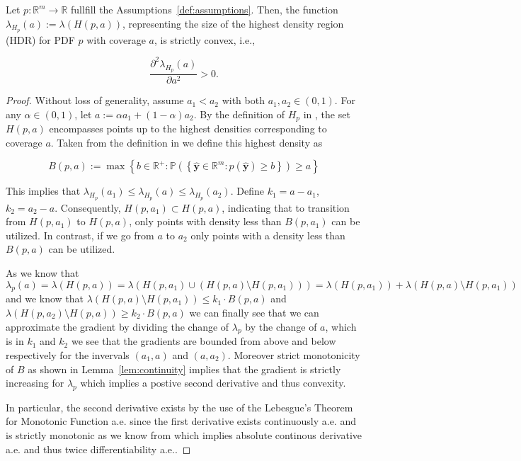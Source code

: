 \begin{lemma}
    Let \(p: \mathbb{R}^m \to \mathbb{R}\) fullfill the Assumptions~\ref{def:assumptions}. Then, the function \(\lambda_{H_p}(a) := \lambda(H(p, a))\), representing the size of the highest density region (HDR) for PDF \(p\) with coverage \(a\), is strictly convex, i.e.,

    \begin{equation}
        \frac{\partial^2 \lambda_{H_p}(a)}{\partial a^2} > 0. 
    \end{equation}

\end{lemma}
\begin{proof}
    Without loss of generality, assume \(a_1 < a_2\) with both \(a_1, a_2 \in (0,1)\). For any \(\alpha \in (0, 1)\), let \(a := \alpha a_1 + (1-\alpha) a_2\). By the definition of \(H_p\) in , the set \(H(p, a)\) encompasses points up to the highest densities corresponding to coverage \(a\). Taken from the definition in  we define this highest density as

    \begin{equation}
        B(p, a):=\max \left\{b \in \mathbb{R^+}: \mathbb{P}\left(\left\{\mathbf{\hat{y}}
        \in
        \mathbb{R}^m: p(\mathbf{\hat{y}}) \geq b\right\}\right) \geq a
        \right\}
    \end{equation}

    This implies that \(\lambda_{H_p}(a_1) \leq \lambda_{H_p}(a) \leq \lambda_{H_p}(a_2)\). Define $k_1 = a-a_1$, $k_2 = a_2 - a$. Consequently, \(H(p, a_1) \subset H(p, a)\), indicating that to transition from \(H(p, a_1)\) to \(H(p, a)\), only points with density less than $B(p, a_1)$ can be utilized. In contrast, if we go from $a$ to $a_2$ only points with a density less than $B(p, a)$ can be utilized.
    
    As we know that 
    \begin{equation}
        \lambda_p(a) = \lambda(H(p, a)) = \lambda(H(p, a_1) \cup (H(p,a)\setminus H(p,a_1))) = \lambda(H(p, a_1)) + \lambda(H(p,a)\setminus H(p, a_1))
    \end{equation}
    and we know that $\lambda(H(p,a)\setminus H(p, a_1)) \leq k_1 \cdot B(p, a)$ and $\lambda(H(p,a_2)\setminus H(p, a)) \geq k_2 \cdot B(p, a)$ we can finally see that we can approximate the gradient by dividing the change of $\lambda_p$ by the change of $a$, which is in $k_1$ and $k_2$ we see that the gradients are bounded from above and below respectively for the invervals $(a_1, a)$ and $(a, a_2)$. Moreover strict monotonicity of $B$ as shown in Lemma~\ref{lem:continuity} implies that the gradient is strictly increasing for $\lambda_p$ which implies a postive second derivative and thus convexity. 
    
    In particular, the second derivative exists by the use of the Lebesgue's Theorem for Monotonic Function a.e. since the first derivative exists continuously a.e. and is strictly monotonic as we know from  which implies absolute continous derivative a.e. and thus twice differentiability a.e..
\end{proof}

